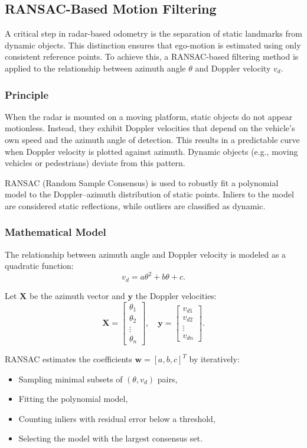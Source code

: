 \subsection{RANSAC-Based Motion Filtering}

A critical step in radar-based odometry is the separation of static landmarks from dynamic objects. 
This distinction ensures that ego-motion is estimated using only consistent reference points. 
To achieve this, a RANSAC-based filtering method is applied to the relationship between azimuth angle $\theta$ and Doppler velocity $v_d$.

\subsubsection*{Principle}
When the radar is mounted on a moving platform, static objects do not appear motionless. 
Instead, they exhibit Doppler velocities that depend on the vehicle’s own speed and the azimuth angle of detection. 
This results in a predictable curve when Doppler velocity is plotted against azimuth. 
Dynamic objects (e.g., moving vehicles or pedestrians) deviate from this pattern.  

RANSAC (Random Sample Consensus) is used to robustly fit a polynomial model to the Doppler–azimuth distribution of static points. 
Inliers to the model are considered static reflections, while outliers are classified as dynamic.

\subsubsection*{Mathematical Model}
The relationship between azimuth angle and Doppler velocity is modeled as a quadratic function:
\[
v_d = a\theta^2 + b\theta + c.
\]

Let $\mathbf{X}$ be the azimuth vector and $\mathbf{y}$ the Doppler velocities:
\[
\mathbf{X} = \begin{bmatrix} \theta_1 \\ \theta_2 \\ \vdots \\ \theta_n \end{bmatrix}, \quad 
\mathbf{y} = \begin{bmatrix} v_{d1} \\ v_{d2} \\ \vdots \\ v_{dn} \end{bmatrix}.
\]

RANSAC estimates the coefficients $\mathbf{w} = [a, b, c]^T$ by iteratively:
\begin{itemize}
    \item Sampling minimal subsets of $(\theta, v_d)$ pairs,
    \item Fitting the polynomial model,
    \item Counting inliers with residual error below a threshold,
    \item Selecting the model with the largest consensus set.
\end{itemize}

